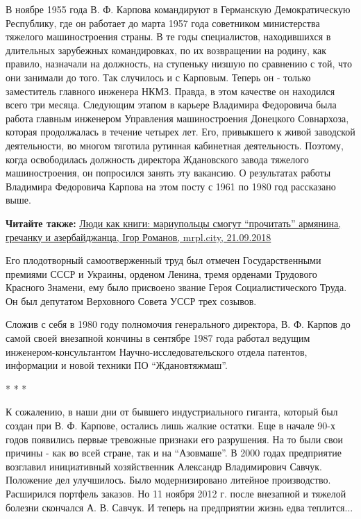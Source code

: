 В ноябре 1955 года В. Ф. Карпова командируют в Германскую Демократическую
Республику, где он работает до марта 1957 года советником министерства тяжелого
машиностроения страны. В те годы специалистов, находившихся в длительных
зарубежных командировках, по их возвращении  на родину, как правило, назначали
на должность, на ступеньку низшую по сравнению с той, что они занимали до того.
Так случилось и с Карповым. Теперь он - только заместитель главного инженера
НКМЗ. Правда, в этом качестве он находился всего три месяца. Следующим этапом в
карьере Владимира Федоровича была работа главным инженером Управления
машиностроения Донецкого Совнархоза, которая продолжалась в течение четырех
лет. Его, привыкшего к живой заводской деятельности, во многом тяготила
рутинная кабинетная деятельность. Поэтому, когда  освободилась должность
директора Ждановского завода тяжелого машиностроения, он попросился занять эту
вакансию. О результатах работы Владимира Федоровича Карпова на этом посту с
1961 по 1980 год рассказано выше.

\textbf{Читайте также:} \href{https://mrpl.city/news/view/lyudi-kak-knigi-mariupoltsy-smogut-prochitat-armyanina-grechanku-i-azerbajdzhanku}{Люди как книги: мариупольцы смогут \enquote{прочитать} армянина, гречанку и азербайджанца, Ігор Романов, mrpl.city, 21.09.2018}

Его плодотворный самоотверженный труд был отмечен Государственными премиями
СССР и Украины, орденом Ленина, тремя орденами Трудового Красного Знамени, ему
было присвоено звание Героя Социалистического Труда. Он был депутатом
Верховного Совета УССР трех созывов.

Сложив с себя в 1980 году полномочия генерального директора, В. Ф. Карпов до
самой своей внезапной кончины в сентябре 1987 года работал ведущим
инженером-консультантом Научно-исследовательского отдела патентов, информации и
новой техники ПО \enquote{Ждановтяжмаш}.

* * *

К сожалению, в наши дни от бывшего индустриального гиганта, который был создан
при В. Ф. Карпове, остались лишь жалкие остатки. Еще в начале 90-х годов
появились первые тревожные признаки его разрушения. На то были свои причины -
как во всей стране, так и на \enquote{Азовмаше}. В 2000 годах предприятие возглавил
инициативный хозяйственник Александр Владимирович Савчук. Положение дел
улучшилось. Было модернизировано литейное производство. Расширился портфель
заказов. Но 11 ноября 2012 г. после внезапной и тяжелой болезни скончался А. В.
Савчук. И теперь на предприятии жизнь едва теплится...
